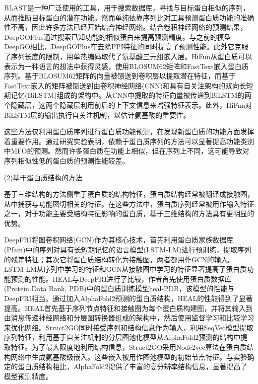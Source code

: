 BLAST\cite{altschul1990basic}是一种广泛使用的工具，用于搜索数据库，寻找与目标蛋白相似的序列，从而推断目标蛋白的潜在功能。然而单纯依靠序列比对工具预测蛋白质功能的准确性不高，因此许多方法已经开始结合神经网络。结合卷积神经网络的预测结果，DeepGOPlus\cite{kulmanov2020deepgoplus}通过搜索已知功能的相似蛋白来提高预测精度。与之前的模型DeepGO\cite{kulmanov2018deepgo}相比，DeepGOPlus在去除PPI特征的同时提高了预测性能。此外它克服了序列长度的限制，用单热编码取代了氨基酸三元组嵌入层。HiFun\cite{wu2023hifun}从蛋白质可以表示为一种语言的想法中获得灵感，使用BLOSUM62矩阵\cite{song2014parameterized}和FastText嵌入蛋白质序列。基于BLOSUM62矩阵的向量被馈送到卷积层以提取潜在特征，而基于FastText嵌入的矩阵被馈送到由卷积神经网络(CNN)和具有自关注架构的双向长短期记忆(BiLSTM)\cite{xu2019sentiment}组成的架构中。从CNN中提取的特征向量被传递到BiLSTM的两个隐藏层，这两个隐藏层利用前后的上下文信息来增强特征表示。此外，HiFun对BiLSTM层的输出执行自关注机制，以估计氨基酸的重要性。

这些方法仅利用蛋白质序列进行蛋白质功能预测，在发现新蛋白质的功能方面发挥着重要作用。通过研究实验表明，依赖于蛋白质序列的方法可以显著提高功能类别中MFO的预测。然而许多蛋白质在功能上相似，但在序列上不同，这可能导致对序列相似性低的蛋白质的预测性能较差。

(2)基于蛋白质结构的方法

基于三维结构的方法侧重于蛋白质的结构特征，蛋白质结构经常被翻译成接触图，从中捕获与功能密切相关的特征。在这些方法中，蛋白质序列经常被用作输入特征之一，对于功能主要受结构特征影响的蛋白质，基于三维结构的方法具有更明显的优势。

DeepFRI\cite{gligorijevic2021structure}将图卷积网络(GCN)作为其核心技术，首先利用蛋白质家族数据库(Pfam)\cite{mistry2021pfam}中的序列对具有长短期记忆的语言模型(LSTM-LM)\cite{graves2012long}进行预训练，提取序列的残差特征；其次它将蛋白质结构转化为接触图，两者都用作GCN的输入。LSTM-LM从序列中学习的特征和GCN从接触图中学习的特征显著提高了蛋白质功能预测的性能。HEAL\cite{gu2023hierarchical}与DeepFRI进行了比较，作者首先使用蛋白质数据库(Protein Data Bank, PDB)中的蛋白质训练模型heal-PDB，该模型的性能与DeepFRI相当。通过加入AlphaFold2\cite{varadi2022alphafold}预测的蛋白质结构，HEAL的性能得到了显著提高。HEAL首先基于序列节点特征和接触图为每个蛋白质构建图，并将其输入到由消息传递神经网络和分层图转换器组成的架构中，然后使用监督学习和比较学习来优化网络。Struct2GO\cite{jiao2023struct2go}同时接受序列和结构信息作为输入，利用SeqVec模型\cite{heinzinger2019modeling}提取序列特征，利用基于自关注机制的分层图池化模型从AlphaFold2预测的结构中提取特征。为了最大限度地利用结构信息，Struct2GO采用Node2vec\cite{grover2016node2vec}算法在蛋白质结构网络中生成氨基酸级嵌入。这些嵌入被用作图池模型的初始节点特征。与实验确定的蛋白质结构相比，AlphaFold2提供了丰富的高分辨率结构信息，显著提高了模型预测精度。


